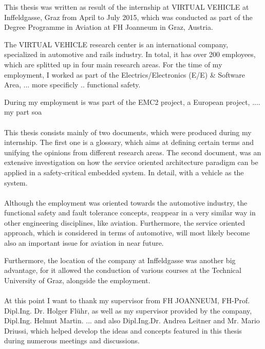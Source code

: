 This thesis was written as result of the internship at VIRTUAL VEHICLE at Inffeldgasse, Graz from April to July 2015, which was conducted as part of the Degree Programme in Aviation at FH Joanneum in Graz, Austria.

The VIRTUAL VEHICLE research center is an international company, specialized in automotive and rails industry. In total, it has over 200 employees, which are splitted up in four main research areas. For the time of my employment, I worked as part of the Electrics/Electronics (E/E) \& Software Area, ... more specificly .. functional safety.

During my employment is was part of the EMC2 project, a European project, ....
my part soa
\\
\\
This thesis consists mainly of two documents, which were produced during my internship. The first one is a glossary, which aims at defining certain terms and unifying the opinions from different research areas. The second document, was an extensive investigation on how the service oriented architecture paradigm can be applied in a safety-critical embedded system. In detail, with a vehicle as the system.
\\
\\
Although the employment was oriented towards the automotive industry, the functional safety and fault tolerance concepts, reappear in a very similar way in other engineering disciplines, like aviation. Furthermore, the service oriented approach, which is considered in terms of automotive, will most likely become also an important issue for aviation in near future.

Furthermore, the location of the company at Inffeldgasse was another big advantage, for it allowed the conduction of various courses at the Technical University of Graz, alongside the employment.
\\
\\
At this point I want to thank my supervisor from FH JOANNEUM, FH-Prof. Dipl.Ing. Dr. Holger Flühr, as well as my supervisor provided by the company, Dipl.Ing. Helmut Martin. ... and also Dipl.Ing.Dr. Andrea Leitner and Mr. Mario Driussi, which helped develop the ideas and concepts featured in this thesis during numerous meetings and discussions.